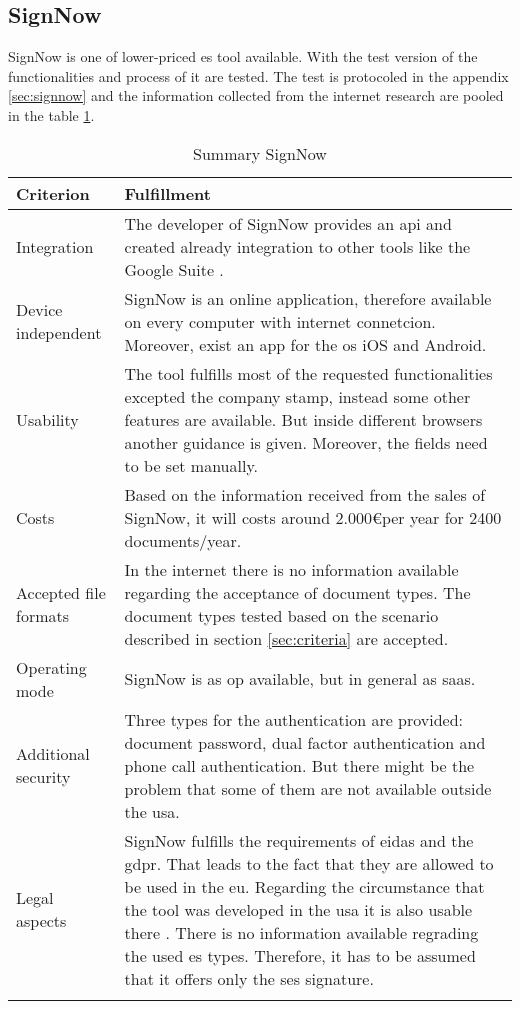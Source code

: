 \subsection{SignNow}
SignNow is one of lower-priced \gls{es} tool available. With the test version of the functionalities and process of it are tested. The test is protocoled in the appendix \ref{sec:signnow} and the information collected from the internet research are pooled in the table \ref{tab:signnow}.
	\begin{longtable}{|p{4cm}|p{10cm}|} \hline
		Criterion & Fulfillment \\ \hline
		Integration & The developer of SignNow provides an \gls{api} and created already integration to other tools like the Google Suite \parencite{signnow2018enterprise,signnow2018price}.\\ \hline
		Device independent & SignNow is an online application, therefore available on every computer with internet connetcion. Moreover, exist an \gls{app} for the \gls{os} iOS and Android.\\ \hline
		Usability & The tool fulfills most of the requested functionalities excepted the company stamp, instead some other features are available. But inside different browsers another guidance is given. Moreover, the fields need to be set manually.\\ \hline
		Costs & Based on the information received from the sales of SignNow, it will costs around 2.000\euro per year for 2400 documents/year.\\ \hline
		Accepted file formats & In the internet there is no information available regarding the acceptance of document types. The document types tested based on the scenario described in section \ref{sec:criteria} are accepted.\\ \hline
		Operating mode & SignNow is as \gls{op} available, but in general as \gls{saas}. \parencite{signnow2018op} \\ \hline
		Additional security & Three types for the authentication are provided: document password, dual factor authentication and phone call authentication. But there might be the problem that some of them are not available outside the \gls{usa}. \parencite{signnow2018security} \\ \hline
		Legal aspects & SignNow fulfills the requirements of \gls{eidas} and the \gls{gdpr}. That leads to the fact that they are allowed to be used in the \gls{eu}. Regarding the circumstance that the tool was developed in the \gls{usa} it is also usable there \parencite{signnow2018legal}. There is no information available regrading the used \gls{es} types. Therefore, it has to be assumed that it offers only the \gls{ses} signature. \\ \hline
	\caption{Summary SignNow}
	\label{tab:signnow}
	\end{longtable}

